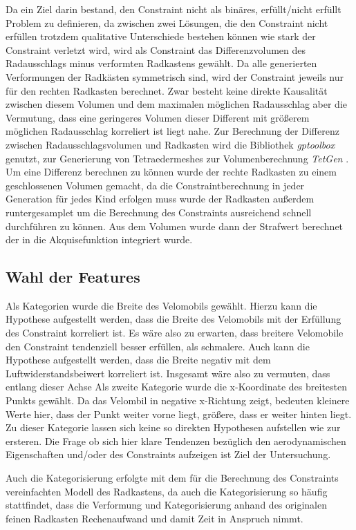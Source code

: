 Da ein Ziel darin bestand, den Constraint nicht als binäres, erfüllt/nicht erfüllt Problem zu definieren, da zwischen zwei Lösungen, die den Constraint nicht erfüllen trotzdem qualitative Unterschiede bestehen können wie stark der Constraint verletzt wird, wird als Constraint das Differenzvolumen des Radausschlags minus verformten Radkastens gewählt.
Da alle generierten Verformungen der Radkästen symmetrisch sind, wird der Constraint jeweils nur für den rechten Radkasten berechnet.
Zwar besteht keine direkte Kausalität zwischen diesem Volumen und dem maximalen möglichen Radausschlag aber die Vermutung, dass eine geringeres Volumen dieser Different mit größerem möglichen Radausschlag korreliert ist liegt nahe.
Zur Berechnung der Differenz zwischen Radausschlagsvolumen und Radkasten wird die Bibliothek \textit{gptoolbox}  genutzt, zur Generierung von Tetraedermeshes zur Volumenberechnung \textit{TetGen} .
Um eine Differenz berechnen zu können wurde der rechte Radkasten zu einem geschlossenen Volumen gemacht, da die Constraintberechnung in jeder Generation für jedes Kind erfolgen muss wurde der Radkasten außerdem runtergesamplet  um die Berechnung  des Constraints ausreichend schnell durchführen zu können.
Aus dem Volumen wurde dann der Strafwert berechnet der in die Akquisefunktion integriert wurde.

\subsection{Wahl der Features}
Als Kategorien wurde die Breite des Velomobils gewählt.
Hierzu kann die Hypothese aufgestellt werden, dass die Breite des Velomobils mit der Erfüllung des Constraint korreliert ist. Es wäre also zu erwarten, dass breitere Velomobile den Constraint tendenziell besser erfüllen, als schmalere.
Auch kann die Hypothese aufgestellt werden, dass die Breite negativ mit dem Luftwiderstandsbeiwert korreliert ist.
Insgesamt wäre also zu vermuten, dass entlang dieser Achse
Als zweite Kategorie wurde die x-Koordinate des breitesten Punkts gewählt.
Da das Velombil in negative x-Richtung zeigt, bedeuten kleinere Werte hier, dass der Punkt weiter vorne liegt, größere, dass er weiter hinten liegt.
Zu dieser Kategorie lassen sich keine so direkten Hypothesen aufstellen wie zur ersteren.
Die Frage ob sich hier klare Tendenzen bezüglich den aerodynamischen Eigenschaften und/oder des Constraints aufzeigen ist Ziel der Untersuchung.

Auch die Kategorisierung erfolgte mit dem für die Berechnung des Constraints vereinfachten Modell des Radkastens, da auch die Kategorisierung so häufig stattfindet, dass die Verformung und Kategorisierung anhand des originalen feinen Radkasten Rechenaufwand und damit Zeit in Anspruch nimmt.


